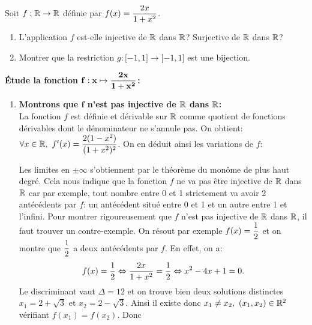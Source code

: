 \documentclass[a4paper, 11pt,reqno]{article}
\begin{document}
\begin{exercice}  \;
	Soit $f: \mathbb{R}\rightarrow \mathbb{R}$ d\'efinie par $f(x)=\displaystyle \frac{2x}{1+x^2}$.
	\begin{enumerate}
		\item
		      L'application $f$ est-elle injective de $\mathbb{R}$ dans $\mathbb{R}$? Surjective de $\mathbb{R}$ dans $\mathbb{R}$?
		\item
		      Montrer que la restriction $g: \lbrack -1,1\rbrack\rightarrow \lbrack -1,1\rbrack$ est une bijection.
	\end{enumerate}
\end{exercice}
\begin{correction} \;
	\textbf{\'Etude la fonction $\mathbf{f: x\mapsto \displaystyle\frac{2x}{1+x^2}}$:}
	\begin{enumerate}
		\item \textbf{Montrons que $\mathbf{f}$ n'est pas injective de $\mathbf{\mathbb{R}}$ dans $\mathbf{\mathbb{R}}$:}\\
		      \noindent La fonction $f$ est d\'efinie et d\'erivable sur $\mathbb{R}$ comme quotient de fonctions d\'erivables dont le
		      d\'enominateur ne s'annule pas. On obtient: $\forall x\in\R,\ f^{\prime}(x)=\ddp\frac{2(1-x^2)}{(1+x^2)^2}$. On en d\'eduit ainsi les variations de $f$:
		      \begin{center}
		      \end{center}
		      Les limites en $\pm\infty$ s'obtiennent par le th\'eor\`{e}me du mon\^{o}me de plus haut degr\'e. Cela nous indique que la fonction $f$ ne va pas \^{e}tre injective de $\mathbb{R}$ dans $\mathbb{R}$ car par exemple, tout nombre entre 0 et 1 strictement va avoir 2 ant\'ec\'edents par $f$: un ant\'ec\'edent situ\'e entre 0 et 1 et un autre entre 1 et l'infini. Pour montrer rigoureusement que $f$ n'est pas injective de $\mathbb{R}$ dans $\mathbb{R}$, il faut trouver un contre-exemple. On r\'esout par exemple $f(x)=\displaystyle\frac{1}{2}$ et on montre que $\displaystyle\frac{1}{2}$ a deux ant\'ec\'edents par $f$. En effet, on a:
		      $$f(x)=\displaystyle\frac{1}{2}\Leftrightarrow  \displaystyle\frac{2x}{1+x^2}=\displaystyle\frac{1}{2}\Leftrightarrow x^2-4x+1=0.$$
		      Le discriminant vaut $\Delta=12$ et on trouve bien deux solutions distinctes $x_1=2+\sqrt{3}$ et $x_2=2-\sqrt{3}$. Ainsi il existe donc $x_1\not= x_2,\ (x_1,x_2)\in\R^2$ v\'erifiant $f(x_1)=f(x_2)$. Donc 

\end{enumerate}
\end{correction}
\end{document}
